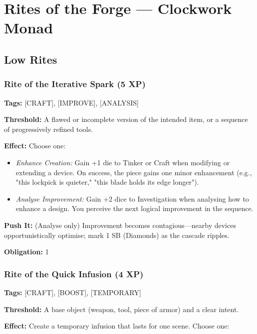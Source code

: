 \section{Rites of the Forge — Clockwork Monad}

\subsection{Low Rites}

\subsubsection{Rite of the Iterative Spark (5 XP)}

\textbf{Tags:} [CRAFT], [IMPROVE], [ANALYSIS]

\textbf{Threshold:} A flawed or incomplete version of the intended item, or a sequence of progressively refined tools.

\textbf{Effect:} Choose one:

\begin{itemize}
\item \textit{Enhance Creation:} Gain +1 die to Tinker or Craft when modifying or extending a device. On success, the piece gains one minor enhancement (e.g., "this lockpick is quieter," "this blade holds its edge longer").
\item \textit{Analyse Improvement:} Gain +2 dice to Investigation when analysing how to enhance a design. You perceive the next logical improvement in the sequence.
\end{itemize}

\textbf{Push It:} (Analyse only) Improvement becomes contagious—nearby devices opportunistically optimise; mark 1 SB (Diamonds) as the cascade ripples.

\textbf{Obligation:} 1

\subsubsection{Rite of the Quick Infusion (4 XP)}

\textbf{Tags:} [CRAFT], [BOOST], [TEMPORARY]

\textbf{Threshold:} A base object (weapon, tool, piece of armor) and a clear intent.

\textbf{Effect:} Create a temporary infusion that lasts for one scene. Choose one:

